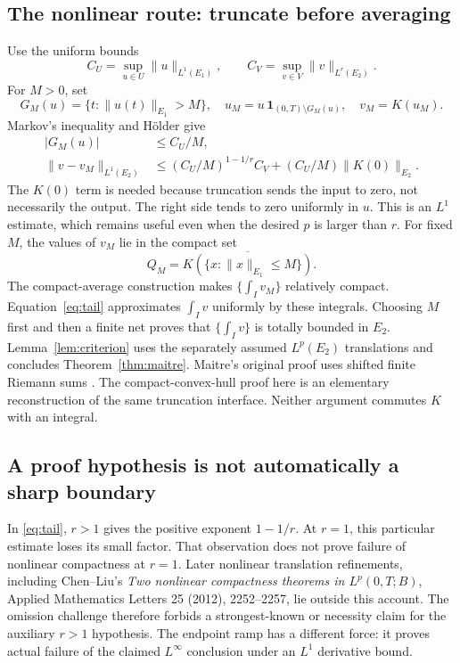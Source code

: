 \documentclass[12pt,reqno]{amsart}
\begin{document}
\subsection{The nonlinear route: truncate before averaging}
Use the uniform bounds
\[
C_U=\sup_{u\in U}\|u\|_{L^1(E_1)},\qquad
C_V=\sup_{v\in V}\|v\|_{L^r(E_2)}.
\]
For $M>0$, set
\[
G_M(u)=\{t:\|u(t)\|_{E_1}>M\},\quad
u_M=u\,\mathbf1_{(0,T)\setminus G_M(u)},\quad v_M=K(u_M).
\]
Markov's inequality and H\"older give
\begin{align}
|G_M(u)|&\le C_U/M,\label{eq:badset}\\
\|v-v_M\|_{L^1(E_2)}
&\le (C_U/M)^{1-1/r}C_V+(C_U/M)\|K(0)\|_{E_2}.
\label{eq:tail}
\end{align}
The $K(0)$ term is needed because truncation sends the input to zero, not necessarily the output. The right side tends to zero uniformly in $u$. This is an $L^1$ estimate, which remains useful even when the desired $p$ is larger than $r$.
For fixed $M$, the values of $v_M$ lie in the compact set
\[
Q_M=\overline{K(\{x:\|x\|_{E_1}\le M\})}.
\]
The compact-average construction makes $\{\int_Iv_M\}$ relatively compact. Equation~\eqref{eq:tail} approximates $\int_Iv$ uniformly by these integrals. Choosing $M$ first and then a finite net proves that $\{\int_Iv\}$ is totally bounded in $E_2$. Lemma~\ref{lem:criterion} uses the separately assumed $L^p(E_2)$ translations and concludes Theorem~\ref{thm:maitre}.
Maitre's original proof uses shifted finite Riemann sums \cite[Lemma 2.3, equations (2.3)--(2.24), pp.~1726--1730]{S-maitre}. The compact-convex-hull proof here is an elementary reconstruction of the same truncation interface. Neither argument commutes $K$ with an integral.
\subsection{A proof hypothesis is not automatically a sharp boundary}
In \eqref{eq:tail}, $r>1$ gives the positive exponent $1-1/r$. At $r=1$, this particular estimate loses its small factor. That observation does not prove failure of nonlinear compactness at $r=1$.
Later nonlinear translation refinements, including Chen--Liu's \emph{Two nonlinear compactness theorems in $L^p(0,T;B)$}, Applied Mathematics Letters 25 (2012), 2252--2257, lie outside this account. The omission challenge therefore forbids a strongest-known or necessity claim for the auxiliary $r>1$ hypothesis. The endpoint ramp has a different force: it proves actual failure of the claimed $L^\infty$ conclusion under an $L^1$ derivative bound.
\end{document}
